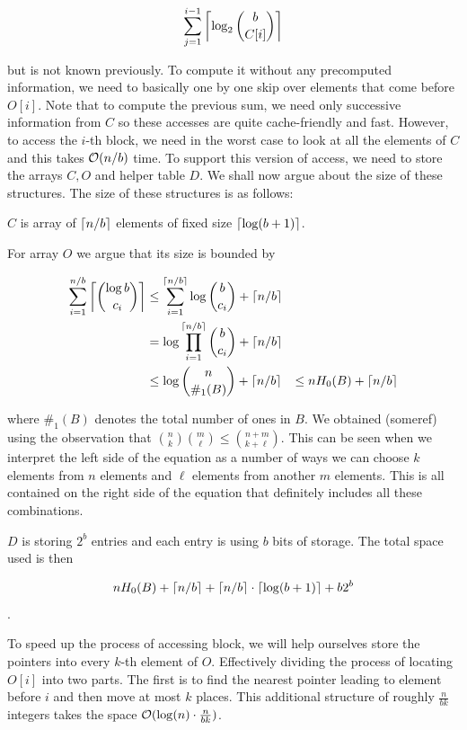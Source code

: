                 $$\sum_{j=1}^{i-1} \left\lceil \log_2{b\choose C[i]} \right\rceil$$

but is not known previously. To compute it without any precomputed information,
we need to basically one by one skip over elements that come before $O[i]$.
Note that to compute the previous sum, we need only successive information from $C$ so these
accesses are quite cache-friendly and fast. However, to access the $i$-th block, we need in the
worst case to look at all the elements of $C$ and this takes $\mathcal{O}(n/b)$ time. To support
this version of access, we need to store the arrays $C, O$ and helper table $D$. We shall
now argue about the size of these structures. The size of these structures is
as follows:

$C$ is array of $\left\lceil n/b \right\rceil$ elements of fixed size $\left\lceil \log(b+1) \right\rceil$.

For array $O$ we argue that its size is bounded by

\begin{align*}
    \sum_{i=1}^{n/b} \left\lceil {\log b\choose c_i} \right\rceil
    &\leq \sum_{i=1}^{\left\lceil n/b \right\rceil} \log {b\choose c_i} + \left\lceil n/b \right\rceil \\
    &= \log\prod_{i=1}^{\left\lceil n/b \right\rceil} {b\choose c_i} + \left\lceil n/b \right\rceil \\
    &\leq \log{n\choose \#_1(B)} + \left\lceil n/b \right\rceil &\leq nH_0(B) + \left\lceil n/b \right\rceil
\end{align*}

where $\#_1(B)$ denotes the total number of ones in $B$. We obtained (someref) using the
observation that ${n\choose k} {m\choose \ell} \leq {n+m\choose k+\ell}$. This can be seen
when we interpret the left side of the equation as a number of ways we can choose $k$ elements
from $n$ elements and $\ell$ elements from another $m$ elements. This is all contained on the
right side of the equation that definitely includes all these combinations.

$D$ is storing $2^b$ entries and each entry is using $b$ bits of storage.
The total space used is then

$$nH_0(B) + \left\lceil n/b \right\rceil + \left\lceil n/b \right\rceil \cdot \left\lceil \log(b+1) \right\rceil + b2^b$$.

To speed up the process of accessing block, we will help ourselves store the pointers
into every $k$-th element of $O$. Effectively dividing the process of locating $O[i]$ into two
parts. The first is to find the nearest pointer leading to element before $i$ and
then move at most $k$ places. This additional structure of roughly $\frac{n}{bk}$ integers
takes the space $\mathcal{O}(\log(n)\cdot \frac{n}{bk})$.

